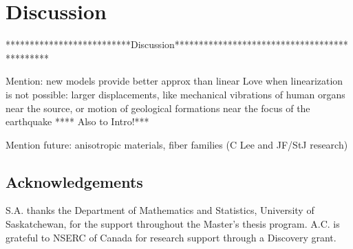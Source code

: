 \documentclass[11pt,letter,subeqn,fleqn]{article}
\numberwithin{equation}{section}
\numberwithin{table}{section}
\numberwithin{figure}{section}
\begin{document}
\section{Discussion}\label{sec:Discussion}

**************************Discussion*********************************************

Mention: new models provide better approx than linear Love when linearization is not possible: larger displacements, like mechanical vibrations of human organs near the source, or motion of geological formations near the focus of the earthquake **** Also to Intro!***


Mention future: anisotropic materials, fiber families (C Lee and JF/StJ research)


\subsection*{Acknowledgements}

S.A. thanks the Department of Mathematics and Statistics, University of Saskatchewan, for the support throughout the Master's thesis program. A.C. is grateful to NSERC of Canada for research support through a Discovery grant.

{\footnotesize
%


}
\end{document}
